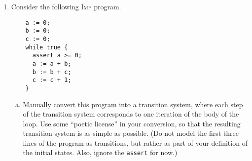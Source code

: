 \documentclass{article}
\newcommand{\imp}{\textsc{Imp}}
\begin{document}
\begin{enumerate}[leftmargin=*,itemindent=*,start=1,label={{\bf Problem \arabic*}.},ref=\arabic*]
\item\label{odeds-program} Consider the following \imp{} program.
  \begin{lstlisting}
    a := 0;
    b := 0;
    c := 0;
    while true {
      assert a >= 0;
      a := a + b;
      b := b + c;
      c := c + 1;
    }
  \end{lstlisting}
  \begin{enumerate}[(a)]
  \item Manually convert this program into a transition system, where each step
    of the transition system corresponds to one iteration of the body of the
    loop. Use some ``poetic license'' in your conversion, so that the resulting
    transition system is as simple as possible. (Do not model the first three
    lines of the program as transitions, but rather as part of your definition
    of the initial states. Also, ignore the \lstinline|assert| for now.)


\end{enumerate}
\end{enumerate}
\end{document}
